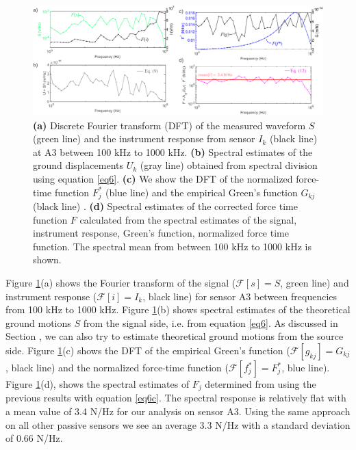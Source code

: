 \documentclass[preprint,3p, 11pt,authoryear]{elsarticle}
\begin{document}
{\begin{figure}[ht]
     	\centering
\includegraphics[scale= 0.9]{FIG7.pdf} 
\caption{\textbf{(a)} Discrete Fourier transform (DFT) of the measured waveform $S$ (green line) and the instrument response from sensor $I_{k}$ (black line) at A3 between 100 kHz to 1000 kHz. \textbf{(b)} Spectral estimates of the ground displacements $U_{k}$ (gray line) obtained from spectral division using equation \eqref{eq6}. \textbf{(c)} We show the DFT of the normalized force-time function $F_{j}^{*}$ (blue line) and the empirical Green's function $G_{kj}$ (black line) . \textbf{(d)} Spectral estimates of the corrected force time function $F$ calculated from the spectral estimates of the signal, instrument response, Green's function, normalized force time function. The spectral mean from between 100 kHz to 1000 kHz is shown.}
	\label{fig7} 
\end{figure}

Figure \ref{fig7}(a) shows the Fourier transform of the signal ($\mathcal{F}[s] = S$, green line) and instrument response ($\mathcal{F}[i] = I_{k}$, black line) for sensor A3 between frequencies from 100 kHz to 1000 kHz. Figure \ref{fig7}(b) shows spectral estimates of the theoretical ground motions $S$ from the signal side, i.e. from equation \eqref{eq6}.  As discussed in Section \label{Spec_deconv}, we can also try to estimate  theoretical ground motions from the source side.  Figure \ref{fig7}(c) shows the DFT of the empirical Green's function ($\mathcal{F}[g_{kj}] = G_{kj}$, black line) and the normalized force-time function ($\mathcal{F}[f^{*}_{j}] = F^{*}_{j}$, blue line). Figure \ref{fig7}(d), shows the spectral estimates of $F_{j}$ determined from using the previous results with equation \eqref{eq6c}.  The spectral response is relatively flat with a mean value of 3.4 N/Hz for our analysis on sensor A3.  Using the same approach on all other passive sensors we see an average 3.3 N/Hz with a standard deviation of 0.66 N/Hz. 

}
\end{document}
